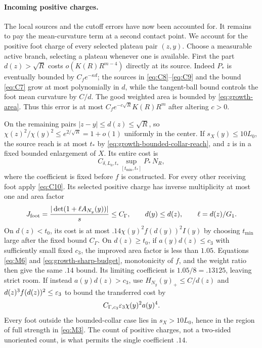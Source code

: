 \paragraph{Incoming positive charges.}
The local sources and the cutoff errors have now been accounted for.
It remains to pay the mean-curvature term at a second contact point.
We account for the positive foot charge of every selected plateau
pair $(z,y)$.  Choose a measurable active branch, selecting a plateau
whenever one is available.  First the part $d(z)>\sqrt R$ costs
$o(K(R)R^{m-4})$ directly at its source.  Indeed $P_*$ is eventually
bounded by $C_fe^{-\kappa d}$; the sources in
\eqref{eq:C8}--\eqref{eq:C9} and the bound \eqref{eq:C7} grow at most
polynomially in $d$, while the tangent-ball bound controls the foot
mean curvature by $C/d$.  The good weighted area is bounded by
\eqref{eq:growth-area}.  Thus this error is at most
$C_fe^{-c\sqrt R}K(R)R^m$ after altering $c>0$.

On the remaining pairs $|z-y|\le d(z)\le\sqrt R$, so
$\chi(z)^2/\chi(y)^2\le e^{2/\sqrt R}=1+o(1)$ uniformly in the
center.  If $s_X(y)\le10L_0$, the source reach is at most $t_*$ by
\eqref{eq:growth-bounded-collar-reach}, and $z$ is in a fixed bounded
enlargement of $X$.  Its entire cost is
\[
 C_{\delta,L_0,t_*}
       \sup_{[t_{\min},t_*]}P_*\,N_R,
\]
where the coefficient is fixed before $f$ is constructed.
For every other receiving foot apply \eqref{eq:C10}.  Its selected
positive charge has inverse multiplicity at most one and area factor
\[
 J_{\rm foot}=\frac{|\det(1+\ell A_{N_y}(y))|}{s}\le C_\Gamma,
 \qquad d(y)\le d(z),\qquad \ell=d(z)/G_1.
\]
On $d(z)<t_0$, its cost is at most $.14\chi(y)^2 f(d(y))^2I(y)$
by choosing $t_{\min}$ large after the fixed bound $C_\Gamma$.
On $d(z)\ge t_0$, if $a(y)d(z)\le c_3$ with sufficiently small fixed
$c_3$, the improved area factor is less than $1.05$.  Equations
\eqref{eq:M6} and \eqref{eq:growth-sharp-budget}, monotonicity of $f$,
and the weight ratio then give the same $.14$ bound.  Its limiting
coefficient is $1.05/8=.13125$, leaving strict room.  If instead
$a(y)d(z)>c_3$, use $H_{N_y}(y)_+\le C/d(z)$ and $d(z)^3f(d(z))^2
\le\varepsilon_3$ to bound the transferred cost by
\[
 C_{\Gamma,c_3}\varepsilon_3\chi(y)^2a(y)^4.
\]
Every foot outside the bounded-collar case lies in $s_X>10L_0$, hence
in the region of full strength in \eqref{eq:M3}.  The count of positive
charges, not a two-sided unoriented count, is what permits the single
coefficient $.14$.

